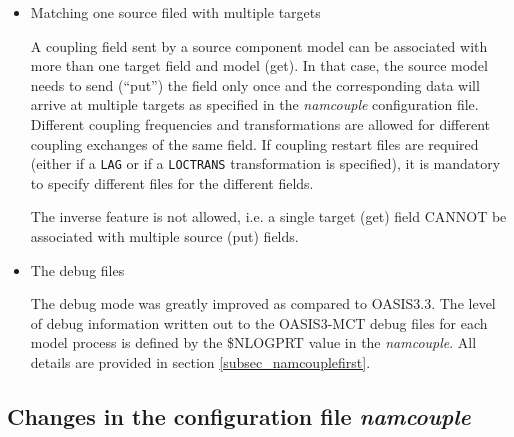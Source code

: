 \begin{itemize}
\item Matching one source filed with multiple targets

  A coupling field sent by a source component model can be associated
  with more than one target field and model (get). In that case, the
  source model needs to send (``put'') the field only once and the
  corresponding data will arrive at multiple targets as specified in
  the {\it namcouple} configuration file. Different coupling
  frequencies and transformations are allowed for different coupling
  exchanges of the same field. If coupling restart files are required
  (either if a {\tt LAG} or if a {\tt LOCTRANS} transformation is
  specified), it is mandatory to specify different files for the
  different fields.

The inverse feature is not allowed, i.e. a single target (get) field
CANNOT be associated with multiple source (put) fields.

\item The debug files

The debug mode was greatly improved as compared to OASIS3.3. The level
of debug information written out to the OASIS3-MCT debug files for
each model process is defined by the \$NLOGPRT value in the {\it
  namcouple}. All details are provided in section
\ref{subsec_namcouplefirst}.

\end{itemize}

\subsection{Changes in the configuration file {\it namcouple}}
\label{sec_changes_namcouple}

